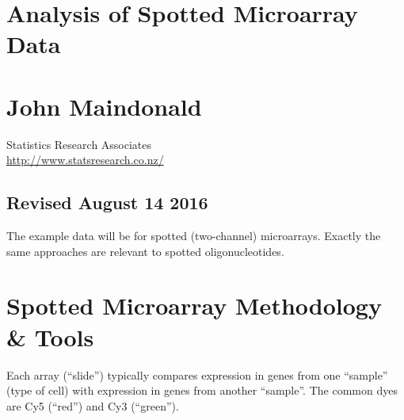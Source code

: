 \documentclass[a4paper,9pt]{article}\usepackage[]{graphicx}\usepackage[]{xcolor}
\begin{document}
\begin{center}
\section*{\LARGE \bf Analysis of Spotted  Microarray Data}

\section*{John Maindonald}
Statistics Research Associates\\
\url{http://www.statsresearch.co.nz/}

\subsection*{Revised August 14 2016}
\end{center}
\vspace*{0.5cm}

The example data will be for spotted (two-channel) microarrays.  Exactly the same approaches are relevant to spotted 
oligonucleotides.

\section{Spotted Microarray Methodology \& Tools}
Each array (``slide'') typically compares expression in genes from one ``sample'' (type of cell) with expression in genes from another
``sample''. The common dyes are Cy5 (``red'') and Cy3 (``green'').
\end{document}
